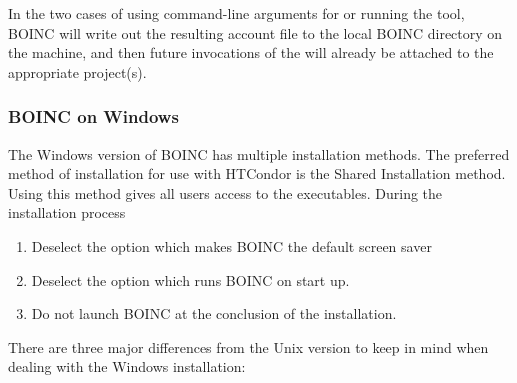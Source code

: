 In the two cases of using command-line arguments for
 or running the  tool,
BOINC will write out the resulting account file to the local BOINC directory
on the machine, and then future invocations of the
 will already be attached to the appropriate
project(s).

\subsubsection{\label{sec:Backfill-BOINC-Windows}BOINC on Windows}

The Windows version of BOINC has multiple installation methods.
The preferred method of installation for use with HTCondor is the 
Shared Installation method.
Using this method gives all users access to the executables.
During the installation process 
\begin{enumerate}
\item
Deselect the option which makes BOINC the default screen saver
\item
Deselect the option which runs BOINC on start up.
\item
Do not launch BOINC at the conclusion of the installation.
\end{enumerate}

There are three major differences from the Unix version
to keep in mind when dealing with the Windows installation:

